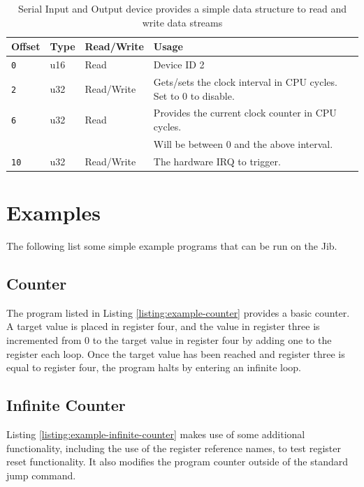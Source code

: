 \documentclass{article}
\begin{document}
\begin{table}[h!]
	\centering
	\begin{tabular}{l|lll}
		\hline
		Offset & Type & Read/Write & Usage \\
		\hline
		\texttt{0} & u16 & Read & Device ID 2 \\
		\texttt{2} & u32 & Read/Write & Gets/sets the clock interval in CPU cycles. Set to 0 to disable. \\
		\texttt{6} & u32 & Read & Provides the current clock counter in CPU cycles. \\
		{} & {} & {} & Will be between 0 and the above interval. \\
		\texttt{10} & u32 & Read/Write & The hardware IRQ to trigger. \\
		\hline
	\end{tabular}
	\caption{Serial Input and Output device provides a simple data structure to read and write data streams}
	\label{table:dev-irq-clock}
\end{table}

\pagebreak

\section{Examples}

The following list some simple example programs that can be run on the Jib.

\subsection{Counter}

The program listed in Listing \ref{listing:example-counter} provides a basic counter. A target value is placed in register four, and the value in register three is incremented from 0 to the target value in register four by adding one to the register each loop. Once the target value has been reached and register three is equal to register four, the program halts by entering an infinite loop.



\pagebreak
\subsection{Infinite Counter}

Listing \ref{listing:example-infinite-counter} makes use of some additional functionality, including the use of the register reference names, to test register reset functionality. It also modifies the program counter outside of the standard jump command.
\end{document}
